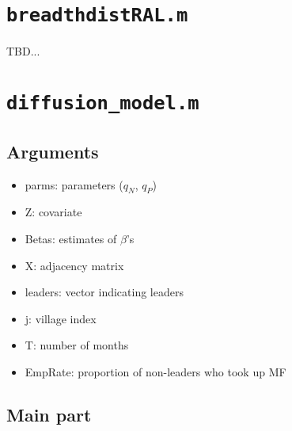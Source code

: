 \documentclass[10pt,letterpaper]{article}
\begin{document}
\section{\texttt{breadthdistRAL.m}}\label{breadthdistRAL}
TBD...

\section{\texttt{diffusion\_model.m}}\label{diffusion_model}

\subsection*{Arguments}
\begin{itemize}
  \item parms: parameters ($q_N$, $q_P$)
  \item Z: covariate
  \item Betas: estimates of $\beta$'s 
  \item X: adjacency matrix
  \item leaders: vector indicating leaders
  \item j: village index
  \item T: number of months
  \item EmpRate: proportion of non-leaders who took up MF
\end{itemize}

\subsection*{Main part}
\end{document}

